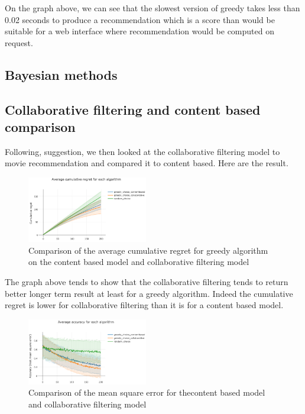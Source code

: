 \documentclass[letterpaper]{article}
\begin{document}
On the graph above, we can see that the slowest version of greedy takes less than 0.02 seconds to produce a recommendation which is a score than would be suitable for a web interface where recommendation would be computed on request.


\subsection{Bayesian methods}



\subsection{Collaborative filtering and content based comparison}

Following, \cite{main} suggestion, we then looked at the collaborative filtering model to movie recommendation and compared it to content based. Here are the result.

\begin{figure}[H]
\begin{center}
\includegraphics[width=0.47\textwidth]{img/collabo1.png}
\caption{Comparison of the average cumulative regret for greedy algorithm on the content based model and collaborative filtering model}
\label{schema}
\end{center}
\end{figure}

The graph above tends to show that the collaborative filtering tends to return better longer term result at least for a greedy algorithm. Indeed the cumulative regret is lower for collaborative filtering than it is for a content based model.

\begin{figure}[H]
\begin{center}
\includegraphics[width=0.47\textwidth]{img/collabo2.png}
\caption{Comparison of the mean square error for thecontent based model and collaborative filtering model}
\label{schema}
\end{center}
\end{figure}
\end{document}
